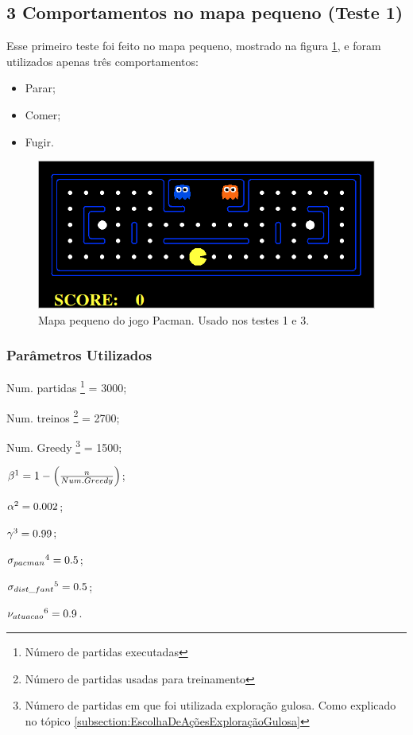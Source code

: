 \subsection{3 Comportamentos no mapa pequeno (Teste 1)} \label{subsection:3ComportamentosMapaPequeno}

Esse primeiro teste foi feito no mapa pequeno, mostrado na figura \ref{img:PlataformaPacmanMapaPequeno}, e foram utilizados apenas três comportamentos:

\begin{itemize}
	\item Parar;
	\item Comer;
	\item Fugir.
\end{itemize}

\begin{figure}[h]
    \centering
    \includegraphics[width=120mm]{images/pacman_small_map}
    \caption{Mapa pequeno do jogo Pacman. Usado nos testes 1 e 3.}
    \label{img:PlataformaPacmanMapaPequeno}
\end{figure}

\subsubsection{Parâmetros Utilizados}

\begin{multicols}{2}

Num. partidas%
\footnote{Número de partidas executadas%
} = 3000;

Num. treinos%
\footnote{Número de partidas usadas para treinamento%
} = 2700;

Num. Greedy%
\footnote{Número de partidas em que foi utilizada exploração gulosa. Como explicado no tópico \ref{subsection:EscolhaDeAçõesExploraçãoGulosa}%
} = 1500;

$ \beta%
\footnote{Fator de exploração gulosa utilizado.%
} = 1 - \left( \frac{n}{Num. Greedy} \right) $;

$ \alpha%
\footnote{Fator de Aprendizagem%
} = 0.002 $;

$ \gamma%
\footnote{Fator de Desconto%
} = 0.99 $;

$ \sigma_{pacman}%
\footnote{Desvio padrão do erro gaussiano da posição recebida do Pacman%
} = 0.5 $;

$ \sigma_{dist\_fant}%
\footnote{Desvio padrão do erro gaussiano da distância recebida para os Fantasmas%
} = 0.5 $;

$ \nu_{atuacao}%
\footnote{Fator de Acerto na movimentação do Pacman. Descrito no algorítmo \ref{algorithm:ErroAtuacao} na seção \ref{section:AmbienteDeTestes}%
} = 0.9 $.

\end{multicols}

